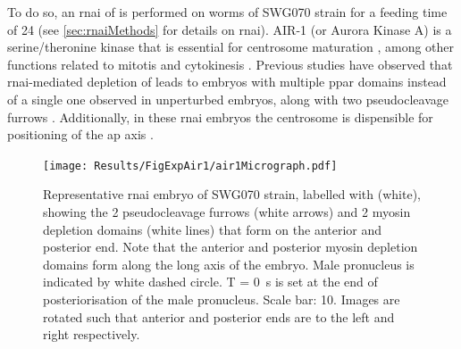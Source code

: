 To do so, an \ac{rnai} of  is performed on worms of SWG070 strain for a feeding time of \SI{24}{\unitRNAiTime} (see \autoref{sec:rnaiMethods} for details on \ac{rnai}). AIR-1 (or Aurora Kinase A) is a serine/theronine kinase that is essential for centrosome maturation \citep{hannak2001aurora}, among other functions related to mitotis and cytokinesis \citep{kapoor2019centrosome}. Previous studies have observed that \ac{rnai}-mediated depletion of  leads to embryos with multiple \ac{ppar} domains instead of a single one observed in unperturbed embryos, along with two pseudocleavage furrows \citep{kapoor2019centrosome,klinkert2019aurora}. Additionally, in these \ac{rnai} embryos the centrosome is dispensible for positioning of the \ac{ap} axis \citep{kapoor2019centrosome,klinkert2019aurora}. 

\begin{figure}
\centering
\texttt{[image: Results/FigExpAir1/air1Micrograph.pdf]}
\caption[Representative micrograph:  \acs{rnai} embryos]{Representative  \acs{rnai} embryo of SWG070 strain, labelled with  (white), showing the 2 pseudocleavage furrows (white arrows) and 2 myosin depletion domains (white lines) that form on the anterior and posterior end. Note that the anterior and posterior myosin depletion domains form along the long axis of the embryo. Male pronucleus is indicated by white dashed circle. T = \SI{0}{\second} is set at the end of posteriorisation of the male pronucleus. Scale bar: \SI{10}{\unitLength}. Images are rotated such that anterior and posterior ends are to the left and right respectively.}
\label{fig:swg070Air1Micrograph}
\end{figure}

